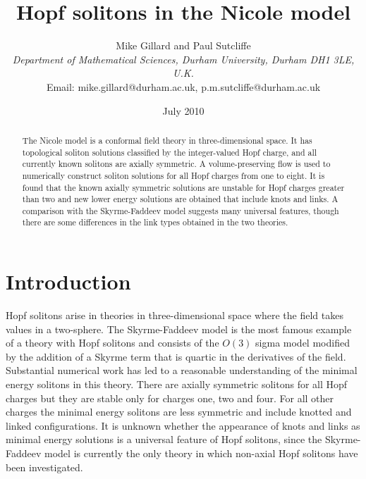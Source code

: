 \documentclass[12pt]{article}
\newcommand{\news}{\setcounter{equation}{0}\quad}
\begin{document}
\title{
\vskip 2cm Hopf solitons in the Nicole model}
\author{
Mike Gillard and Paul Sutcliffe\\[10pt]
{\em \normalsize Department of Mathematical Sciences,
Durham University, Durham DH1 3LE, U.K.}\\[10pt]
{\normalsize Email: 
\quad mike.gillard@durham.ac.uk,
 \quad p.m.sutcliffe@durham.ac.uk}
}
\date{July 2010}
\maketitle
\begin{abstract}
The Nicole model is a conformal field theory in three-dimensional
space. It has topological soliton solutions classified by the 
integer-valued Hopf charge, and all currently known solitons are axially 
symmetric. A volume-preserving flow is used to numerically construct
soliton solutions for all Hopf charges from one to eight. It is found
that the known axially symmetric solutions are unstable for Hopf charges
greater than two and new lower energy solutions are obtained that
include knots and links. A comparison with the Skyrme-Faddeev
model suggests many universal features, though there are some differences
in the link types obtained in the two theories.
\end{abstract}

\newpage
\section{Introduction}\news
Hopf solitons arise in theories in three-dimensional space
where the field takes values in a two-sphere. 
The Skyrme-Faddeev model \cite{Fa2}
is the most famous example of a theory with Hopf solitons and 
consists of the $O(3)$ sigma model modified by the addition
of a Skyrme term that is quartic in the derivatives of the field.
Substantial numerical work \cite{FN,GH,BS5,HS,Su} 
has led to a reasonable understanding of the minimal energy solitons in this
theory. There are axially symmetric solitons for all Hopf charges but
they are stable only for charges one, two and four. For all other 
charges the minimal energy solitons are less symmetric and include knotted
and linked configurations. It is unknown whether the appearance of 
knots and links as minimal energy solutions is a universal feature 
of Hopf solitons, since the Skyrme-Faddeev model is currently the only
theory in which non-axial Hopf solitons have been investigated. 
\end{document}
